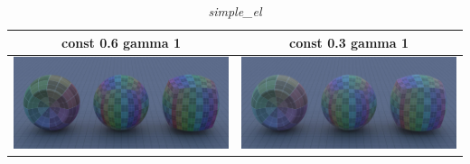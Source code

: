 \documentclass[11pt]{article}
\begin{document}
\begin{table}[ht]
  \centering
  \begin{tabular}{ | c | c | }
    \hline
    const 0.6 gamma 1 & const 0.3 gamma 1 \\ \hline
    \begin{minipage}{.3\textwidth}
      \includegraphics[scale=0.1]{img/obj/simple_el/simple_el_disney_dc03_dg1.jpg}
    \end{minipage}
    &
    \begin{minipage}{.3\textwidth}
      \includegraphics[scale=0.1]{img/obj/simple_el/simple_el_disney_dg1.jpg}
    \end{minipage}
    \\ \hline
  \end{tabular}
  \caption{\textit{simple\_el}}\label{tbl:myLboro}
\end{table}
\end{document}
